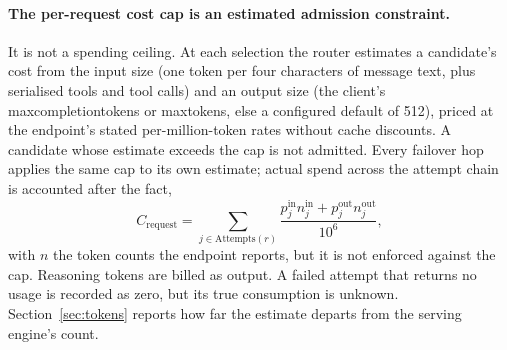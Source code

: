 \documentclass[11pt]{article}
\newcommand{\ubreak}{\textunderscore\allowbreak}
\newcommand{\code}[1]{{\ttfamily\let\_\ubreak #1}}
\begin{document}
\paragraph{The per-request cost cap is an estimated admission constraint.} It is not a spending
ceiling. At each selection the router estimates a candidate's cost from the input size (one
token per four characters of message text, plus serialised tools and tool calls) and an output
size (the client's \code{max\_completion\_tokens} or \code{max\_tokens}, else a configured
default of 512), priced at the endpoint's stated per-million-token rates without cache
discounts. A candidate whose estimate exceeds the cap is not admitted. Every failover hop applies
the same cap to its own estimate; actual spend across the attempt chain is accounted after the
fact,
\[
C_{\mathrm{request}} = \sum_{j \in \mathrm{Attempts}(r)}
  \frac{p^{\mathrm{in}}_j n^{\mathrm{in}}_j + p^{\mathrm{out}}_j n^{\mathrm{out}}_j}{10^6},
\]
with $n$ the token counts the endpoint reports, but it is not enforced against the cap. Reasoning
tokens are billed as output. A failed attempt that returns no usage is recorded as zero, but
its true consumption is unknown. Section~\ref{sec:tokens}
reports how far the estimate departs from the serving engine's count.
\end{document}
